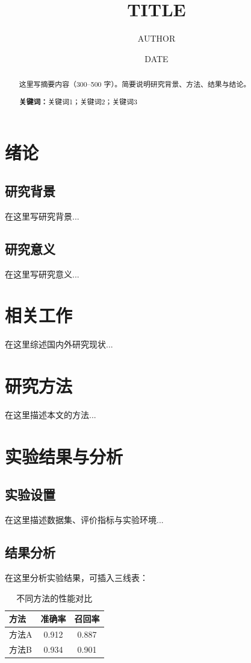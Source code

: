 \documentclass[12pt,a4paper]{article}
\title{{{TITLE}}}
\author{{{AUTHOR}}}
\date{{{DATE}}}
\begin{document}
\maketitle

\begin{abstract}
这里写摘要内容（300--500 字）。简要说明研究背景、方法、结果与结论。

\noindent\textbf{关键词：}关键词1；关键词2；关键词3
\end{abstract}

\tableofcontents
\newpage

\section{绪论}

\subsection{研究背景}
在这里写研究背景...

\subsection{研究意义}
在这里写研究意义...

\section{相关工作}
在这里综述国内外研究现状...

\section{研究方法}
在这里描述本文的方法...

\section{实验结果与分析}

\subsection{实验设置}
在这里描述数据集、评价指标与实验环境...

\subsection{结果分析}
在这里分析实验结果，可插入三线表：

\begin{table}[htbp]
\centering
\begin{tabular}{lcc}
\toprule
方法 & 准确率 & 召回率 \\
\midrule
方法A & 0.912 & 0.887 \\
方法B & 0.934 & 0.901 \\
\bottomrule
\end{tabular}
\caption{不同方法的性能对比}
\label{tab:comparison}
\end{table}
\end{document}
